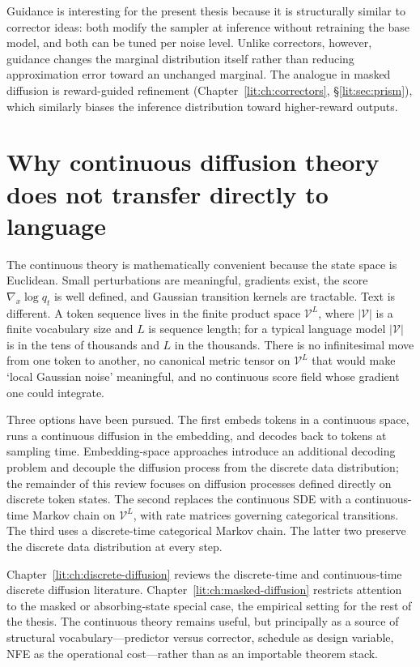 Guidance is interesting for the present thesis because it is structurally
similar to corrector ideas: both modify the sampler at inference without
retraining the base model, and both can be tuned per noise level. Unlike
correctors, however, guidance changes the marginal distribution itself
rather than reducing approximation error toward an unchanged marginal. The
analogue in masked diffusion is reward-guided refinement
(Chapter~\ref{lit:ch:correctors}, \S\ref{lit:sec:prism}), which similarly
biases the inference distribution toward higher-reward outputs.

\section{Why continuous diffusion theory does not transfer directly to language}
\label{lit:sec:to-discrete}

The continuous theory is mathematically convenient because the state space
is Euclidean. Small perturbations are meaningful, gradients exist, the
score $\nabla_x\log q_t$ is well defined, and Gaussian transition kernels
are tractable. Text is different. A token sequence lives in the finite
product space $\mathcal{V}^L$, where $|\mathcal{V}|$ is a finite vocabulary
size and $L$ is sequence length; for a typical language model
$|\mathcal{V}|$ is in the tens of thousands and $L$ in the thousands. There
is no infinitesimal move from one token to another, no canonical metric
tensor on $\mathcal{V}^L$ that would make `local Gaussian noise' meaningful,
and no continuous score field whose gradient one could integrate.

Three options have been pursued. The first embeds tokens in a continuous
space, runs a continuous diffusion in the embedding, and decodes back to
tokens at sampling time. Embedding-space approaches introduce an
additional decoding problem and decouple the diffusion process from the
discrete data distribution; the remainder of this review focuses on
diffusion processes defined directly on discrete token states. The
second replaces the continuous SDE with a continuous-time Markov chain
on $\mathcal{V}^L$, with rate matrices governing categorical transitions.
The third uses a discrete-time categorical Markov chain. The latter two
preserve the discrete data distribution at every step.

Chapter~\ref{lit:ch:discrete-diffusion} reviews the discrete-time and
continuous-time discrete diffusion literature.
Chapter~\ref{lit:ch:masked-diffusion} restricts attention to the masked or
absorbing-state special case, the empirical setting for the rest of the
thesis. The continuous theory remains useful, but principally as a source of
structural vocabulary---predictor versus corrector, schedule as design
variable, NFE as the operational cost---rather than as an importable theorem
stack.


